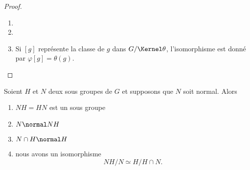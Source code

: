 \begin{proof}
    \begin{enumerate}
        \item
        \item
        \item
            Si \( [g]\) représente la classe de \( g\) dans \( G/\Kernel\theta\), l'isomorphisme est donné par \( \varphi[g]=\theta(g)\).
    \end{enumerate}
\end{proof}


\begin{theorem}
    Soient \( H\) et \( N\) deux sous groupes de \( G\) et supposons que \( N\) soit normal. Alors
    \begin{enumerate}
        \item
            \( NH=HN\) est un sous groupe
        \item
            \( N\normal NH\)
        \item
            \( N\cap H\normal H\)
        \item
            nous avons un isomorphisme
            \begin{equation}
                NH/N\simeq H/H\cap N.
            \end{equation}
    \end{enumerate}
\end{theorem}

